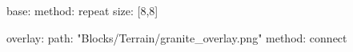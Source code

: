 base:
  method: repeat
  size: [8,8]

overlay:
  path: "Blocks/Terrain/granite_overlay.png"
  method: connect